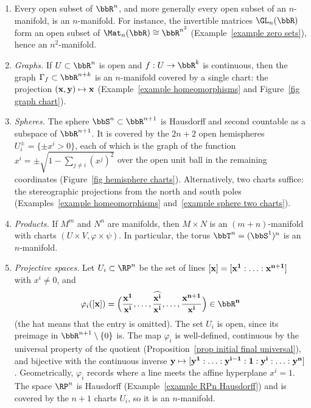 \begin{example}\label{example topological manifolds}
    \begin{enumerate}
        \item Every open subset of $\bbR^n$, and more generally every open subset of an $n$-manifold, is an $n$-manifold. For instance, the invertible matrices $\GL_n(\bbR)$ form an open subset of $\Mat_n(\bbR)\cong\bbR^{n^2}$ (Example~\ref{example zero sets}), hence an $n^2$-manifold.
        \item \emph{Graphs.} If $U\subset\bbR^n$ is open and $f:U\to\bbR^k$ is continuous, then the graph $\Gamma_f\subset\bbR^{n+k}$ is an $n$-manifold covered by a single chart: the projection $(\bf{x},\bf{y})\mapsto\bf{x}$ (Example~\ref{example homeomorphisms} and Figure~\ref{fig graph chart}).
        \item \emph{Spheres.} The sphere $\bbS^n\subset\bbR^{n+1}$ is Hausdorff and second countable as a subspace of $\bbR^{n+1}$. It is covered by the $2n+2$ open hemispheres $U_i^\pm=\{\pm x^i>0\}$, each of which is the graph of the function $x^i=\pm\sqrt{1-\sum_{j\neq i}(x^j)^2}$ over the open unit ball in the remaining coordinates (Figure~\ref{fig hemisphere charts}). Alternatively, two charts suffice: the stereographic projections from the north and south poles (Examples~\ref{example homeomorphisms} and~\ref{example sphere two charts}).
        \item \emph{Products.} If $M^m$ and $N^n$ are manifolds, then $M\times N$ is an $(m+n)$-manifold with charts $(U\times V,\varphi\times\psi)$. In particular, the torus $\bbT^n=(\bbS^1)^n$ is an $n$-manifold.
        \item \emph{Projective spaces.} Let $U_i\subset\RP^n$ be the set of lines $[\bf{x}]=[x^1:\ldots:x^{n+1}]$ with $x^i\neq0$, and
        \[\varphi_i([\bf{x}])=\Big(\frac{x^1}{x^i},\ldots,\widehat{\frac{x^i}{x^i}},\ldots,\frac{x^{n+1}}{x^i}\Big)\in\bbR^n\]
        (the hat means that the entry is omitted). The set $U_i$ is open, since its preimage in $\bbR^{n+1}\setminus\{0\}$ is. The map $\varphi_i$ is well-defined, continuous by the universal property of the quotient (Proposition~\ref{prop initial final universal}), and bijective with the continuous inverse $\bf{y}\mapsto[y^1:\ldots:y^{i-1}:1:y^i:\ldots:y^n]$. Geometrically, $\varphi_i$ records where a line meets the affine hyperplane $x^i=1$. The space $\RP^n$ is Hausdorff (Example~\ref{example RPn Hausdorff}) and is covered by the $n+1$ charts $U_i$, so it is an $n$-manifold.
    \end{enumerate}
\end{example}

